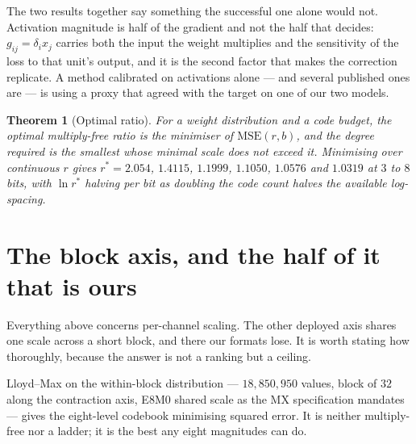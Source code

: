 \documentclass[11pt]{article}
\newtheorem{theorem}{Theorem}
\theoremstyle{definition}
\begin{document}
The two results together say something the successful one alone would not.
Activation magnitude is half of the gradient and not the half that decides:
$g_{ij} = \delta_i x_j$ carries both the input the weight multiplies and the
sensitivity of the loss to that unit's output, and it is the second factor that
makes the correction replicate. A method calibrated on activations alone --- and
several published ones are --- is using a proxy that agreed with the target on
one of our two models.

\begin{theorem}[Optimal ratio]\label{thm:optratio}
For a weight distribution and a code budget, the optimal multiply-free ratio is
the minimiser of $\mathrm{MSE}(r,b)$, and the degree required is the smallest
whose minimal scale does not exceed it. Minimising over continuous $r$ gives
$r^{*}=2.054$, $1.4115$, $1.1999$, $1.1050$, $1.0576$ and $1.0319$ at $3$ to
$8$ bits,
with $\ln r^{*}$ halving per bit as doubling the code count halves the available
log-spacing.
\end{theorem}

\section{The block axis, and the half of it that is ours}
\label{sec:blockbound}

Everything above concerns per-channel scaling. The other deployed axis shares
one scale across a short block, and there our formats lose. It is worth stating
how thoroughly, because the answer is not a ranking but a ceiling.

Lloyd--Max on the within-block distribution --- $18{,}850{,}950$ values, block of
$32$ along the contraction axis, E8M0 shared scale as the MX specification
mandates --- gives the eight-level codebook minimising squared error. It is
neither multiply-free nor a ladder; it is the best any eight magnitudes can do.
\end{document}
